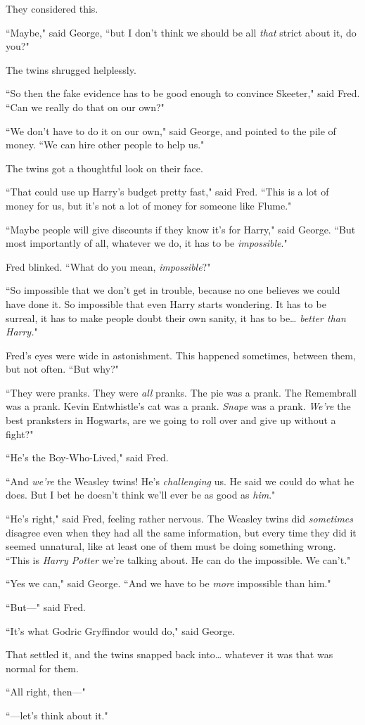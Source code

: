 They considered this.

``Maybe," said George, ``but I don't think we should be all \emph{that} strict about it, do you?"

The twins shrugged helplessly.

``So then the fake evidence has to be good enough to convince Skeeter," said Fred. ``Can we really do that on our own?"

``We don't have to do it on our own," said George, and pointed to the pile of money. ``We can hire other people to help us."

The twins got a thoughtful look on their face.

``That could use up Harry's budget pretty fast," said Fred. ``This is a lot of money for us, but it's not a lot of money for someone like Flume."

``Maybe people will give discounts if they know it's for Harry," said George. ``But most importantly of all, whatever we do, it has to be \emph{impossible}."

Fred blinked. ``What do you mean, \emph{impossible}?"

``So impossible that we don't get in trouble, because no one believes we could have done it. So impossible that even Harry starts wondering. It has to be surreal, it has to make people doubt their own sanity, it has to be{\ldots} \emph{better than Harry.}"

Fred's eyes were wide in astonishment. This happened sometimes, between them, but not often. ``But why?"

``They were pranks. They were \emph{all} pranks. The pie was a prank. The Remembrall was a prank. Kevin Entwhistle's cat was a prank. \emph{Snape} was a prank. \emph{We're} the best pranksters in Hogwarts, are we going to roll over and give up without a fight?"

``He's the Boy-Who-Lived," said Fred.

``And \emph{we're} the Weasley twins! He's \emph{challenging} us. He said we could do what he does. But I bet he doesn't think we'll ever be as good as \emph{him}."

``He's right," said Fred, feeling rather nervous. The Weasley twins did \emph{sometimes} disagree even when they had all the same information, but every time they did it seemed unnatural, like at least one of them must be doing something wrong. ``This is \emph{Harry Potter} we're talking about. He can do the impossible. We can't."

``Yes we can," said George. ``And we have to be \emph{more} impossible than him."

``But—" said Fred.

``It's what Godric Gryffindor would do," said George.

That settled it, and the twins snapped back into{\ldots} whatever it was that was normal for them.

``All right, then—"

``—let's think about it."

